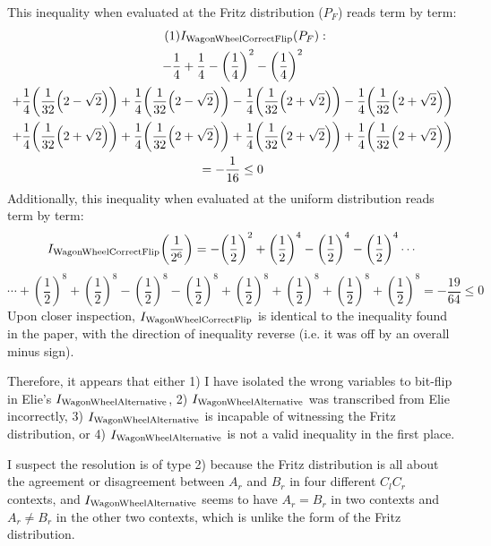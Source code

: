 \documentclass[aps, 10pt, english, twoside, pra, nofootinbib, tightenlines, longbibliography, superscriptaddress]{revtex4-1}
\begin{document}
    This inequality when evaluated at the Fritz distribution ($P_F$) reads term by term:
    \begin{equation*}
    \begin{gathered}
        \eq
        I\tsb{WagonWheelCorrectFlip}(P_F) : \\
        -\frac{1}{4}
        +\frac{1}{4}
        -\left(\frac{1}{4}\right)^2
        -\left(\frac{1}{4}\right)^2\\
        +\frac{1}{4}\left(\frac{1}{32}\left(2-\sqrt{2}\right)\right)
        +\frac{1}{4}\left(\frac{1}{32}\left(2-\sqrt{2}\right)\right)
        -\frac{1}{4}\left(\frac{1}{32}\left(2+\sqrt{2}\right)\right)
        -\frac{1}{4}\left(\frac{1}{32}\left(2+\sqrt{2}\right)\right) \\
        +\frac{1}{4}\left(\frac{1}{32}\left(2+\sqrt{2}\right)\right)
        +\frac{1}{4}\left(\frac{1}{32}\left(2+\sqrt{2}\right)\right)
        +\frac{1}{4}\left(\frac{1}{32}\left(2+\sqrt{2}\right)\right)
        +\frac{1}{4}\left(\frac{1}{32}\left(2+\sqrt{2}\right)\right) \\
        =-\frac{1}{16} \leq 0
    \end{gathered}
    \end{equation*}
    Additionally, this inequality when evaluated at the uniform distribution reads term by term:
    \[ I\tsb{WagonWheelCorrectFlip}\left(\frac{1}{2^6}\right) = -\left(\frac{1}{2}\right)^2+\left(\frac{1}{2}\right)^4-\left(\frac{1}{2}\right)^4-\left(\frac{1}{2}\right)^4\cdots\]
    \[\cdots+\left(\frac{1}{2}\right)^8+\left(\frac{1}{2}\right)^8-\left(\frac{1}{2}\right)^8-\left(\frac{1}{2}\right)^8+\left(\frac{1}{2}\right)^8+\left(\frac{1}{2}\right)^8+\left(\frac{1}{2}\right)^8+\left(\frac{1}{2}\right)^8 = -\frac{19}{64} \leq 0\]
    Upon closer inspection, $I_\text{WagonWheelCorrectFlip}$ is identical to the inequality found in the paper, with the direction of inequality reverse (i.e. it was off by an overall minus sign). 

    Therefore, it appears that either 1) I have isolated the wrong variables to bit-flip in Elie's $I_\text{WagonWheelAlternative}$, 2) $I_\text{WagonWheelAlternative}$ was transcribed from Elie incorrectly, 3) $I_\text{WagonWheelAlternative}$ is incapable of witnessing the Fritz distribution, or 4) $I_\text{WagonWheelAlternative}$ is not a valid inequality in the first place.

    I suspect the resolution is of type 2) because the Fritz distribution is all about the agreement or disagreement between $A_r$ and $B_r$ in four different $C_lC_r$ contexts, and $I_\text{WagonWheelAlternative}$ seems to have $A_r = B_r$ in two contexts and $A_r \neq B_r$ in the other two contexts, which is unlike the form of the Fritz distribution.
\end{document}
